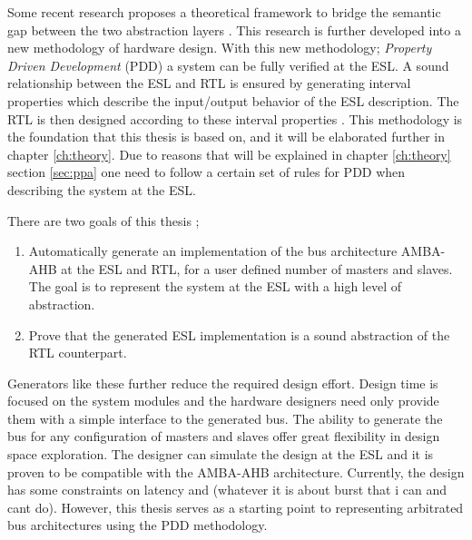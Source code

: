 Some recent research proposes a theoretical framework to bridge the semantic gap between the two abstraction layers \cite{2014-UrdahlStoffel.etal}. This research is further developed into a new methodology of hardware design. With this new methodology; \textit{Property Driven Development} (PDD) a system can be fully verified at the ESL. A sound relationship between the ESL and RTL is ensured by generating interval properties which describe the input/output behavior of the ESL description. The RTL is then designed according to these interval properties \cite{pddref}. This methodology is the foundation that this thesis is based on, and it will be elaborated further in chapter \ref{ch:theory}. Due to reasons that will be explained in chapter \ref{ch:theory} section \ref{sec:ppa} one need to follow a certain set of rules for PDD when describing the system at the ESL. \par 
There are two goals of this thesis ; \\
\begin{enumerate}
 \item Automatically generate an implementation of the bus architecture AMBA-AHB at the ESL and RTL, for a user defined number of masters and slaves. The goal
is to represent the system at the ESL with a high level of abstraction.
 \item Prove that the generated ESL implementation is a sound abstraction of the RTL counterpart.
\end{enumerate}

Generators like these further reduce the required design effort. Design time is focused on the system modules and the hardware designers need only provide them with a simple interface to the generated bus. The ability to generate the bus for any configuration of masters and slaves offer great flexibility in design space exploration. The designer can simulate the design at the ESL and it is proven to be compatible with the AMBA-AHB architecture. Currently, the design has some constraints on latency and (whatever it is about burst that i can and cant do). However, this thesis serves as a starting point to representing arbitrated bus architectures using the PDD methodology.   


 


